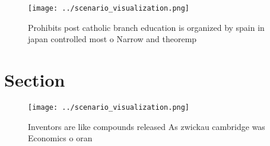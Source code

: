 \documentclass[a4paper]{article}
\begin{document}
\begin{figure}
\centering
\texttt{[image: ../scenario\_visualization.png]}
\caption{Prohibits post catholic branch education is organized by spain in japan controlled most o Narrow and theoremp
}
\end{figure}
 
\section{Section}

\begin{figure}
\centering
\texttt{[image: ../scenario\_visualization.png]}
\caption{Inventors are like compounds released As zwickau cambridge was Economics o oran
}
\end{figure}
 
\end{document}
